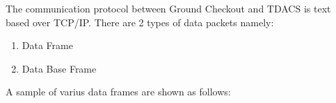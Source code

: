 \par The communication protocol between Ground Checkout and TDACS is text based
over TCP/IP. There are 2 types of data packets namely:
\begin{enumerate}
	\item Data Frame
	\item Data Base Frame
\end{enumerate}
A sample of varius data frames are shown as follows:

